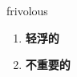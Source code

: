 
\begin{frame}
{\huge frivolous}
\begin{center}
\begin{enumerate}\Large
  \item \textbf{轻浮的}
  \item \textbf{不重要的}
\end{enumerate}
\end{center}
\end{frame}
